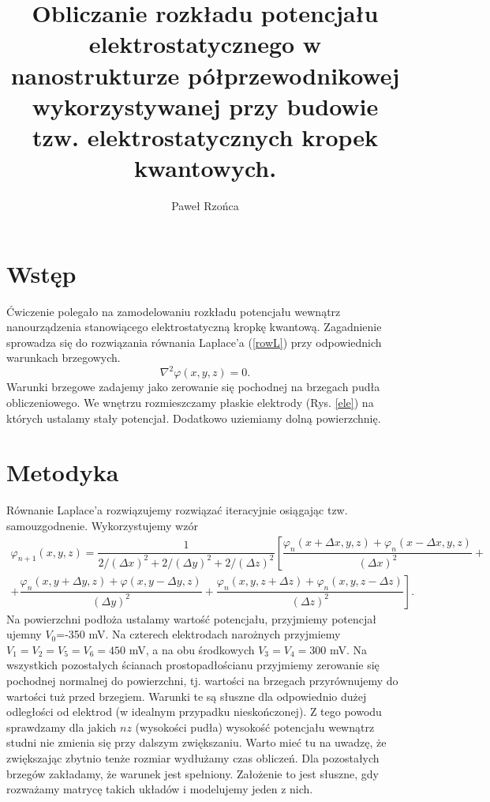 \documentclass[11pt]{article}
\title{Obliczanie rozkładu potencjału elektrostatycznego w nanostrukturze półprzewodnikowej
wykorzystywanej przy budowie tzw. elektrostatycznych kropek kwantowych.}
\author{Paweł Rzońca}
\begin{document}
\maketitle

\section*{Wstęp}
Ćwiczenie polegało na zamodelowaniu rozkładu potencjału wewnątrz nanourządzenia stanowiącego elektrostatyczną kropkę kwantową. Zagadnienie
sprowadza się do rozwiązania równania Laplace'a (\ref{rowL}) przy odpowiednich warunkach brzegowych. 
\begin{equation}
\nabla^2 \varphi (x,y,z) = 0 \label{rowL}.
\end{equation}
Warunki brzegowe zadajemy jako zerowanie się pochodnej na brzegach pudła obliczeniowego. We wnętrzu rozmieszczamy płaskie elektrody (Rys. \ref{ele}) 
na których ustalamy stały potencjał. Dodatkowo uziemiamy dolną powierzchnię. 
\section*{Metodyka}
Równanie Laplace’a rozwiązujemy rozwiązać iteracyjnie osiągając tzw. samouzgodnenie. 
Wykorzystujemy wzór 
\begin{equation}
\begin{aligned}
\varphi_{n+1} (x,y,z) = \dfrac{1}{2/(\Delta x)^2 + 2/(\Delta y)^2 + 2/(\Delta z)^2} \left[ \dfrac{\varphi_n (x + \Delta x,y,z) + 
	\varphi_n (x-\Delta x,y,z)}{(\Delta x)^2} \right. + \\
	+ \left. \dfrac{\varphi_n (x,y+\Delta y,z) + \varphi(x,y-\Delta y,z)}{(\Delta y)^2} + \dfrac{\varphi_n(x,y,z+\Delta z)+
	\varphi_n (x,y,z-\Delta z)}{(\Delta z)^2}  \right].
\end{aligned}
\end{equation}
Na powierzchni podłoża ustalamy wartość potencjału, przyjmiemy potencjał ujemny $V_0$=-350 mV. Na czterech elektrodach narożnych przyjmiemy
$V_1=V_2=V_5=V_6=450$ mV, a na obu środkowych $V_3=V_4=300$ mV. Na wszystkich pozostałych ścianach prostopadłościanu przyjmiemy zerowanie się pochodnej
normalnej do powierzchni, tj. wartości na brzegach przyrównujemy do wartości tuż przed brzegiem. Warunki te są słuszne dla odpowiednio dużej odległości
od elektrod (w idealnym przypadku nieskończonej). Z tego powodu sprawdzamy dla jakich $nz$ (wysokości pudła) wysokość potencjału wewnątrz studni
nie zmienia się przy dalszym zwiększaniu. Warto mieć tu na uwadzę, że zwiększając zbytnio tenże rozmiar wydłużamy czas obliczeń. Dla pozostałych brzegów 
zakładamy, że warunek jest spełniony. Założenie to jest słuszne, gdy rozważamy matrycę takich układów i modelujemy jeden z nich.
\end{document}

